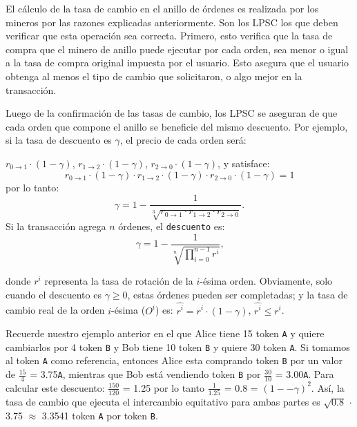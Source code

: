 \documentclass[UTF8,nofonts]{article}
\begin{document}
\begin{multicols}{2}
El c\'alculo de la tasa de cambio en el anillo de \'ordenes es realizada por los mineros por las razones explicadas anteriormente. Son los LPSC los que deben verificar que esta operaci\'on sea correcta. Primero, esto verifica que la tasa de compra que el minero de anillo puede ejecutar por cada orden, sea menor o igual a la tasa de compra original impuesta por el usuario. Esto asegura que el usuario obtenga  al menos el tipo de cambio que solicitaron, o algo mejor en la transacci\'on.	

Luego de la confirmaci\'on de las tasas de cambio, los LPSC se aseguran de que cada orden que compone el anillo se beneficie del mismo descuento. Por ejemplo, si la tasa de descuento es $\gamma$, el precio de cada orden ser\'a:

$r_{0\rightarrow 1} \cdot (1-\gamma)$, $r_{1\rightarrow 2} \cdot (1-\gamma)$, $r_{2 \rightarrow 0} \cdot (1-\gamma)$, y satisface: 
\begin{equation}
r_{0\rightarrow 1} \cdot (1-\gamma)\cdot r_{1\rightarrow 2} \cdot (1-\gamma) \cdot r_{2 \rightarrow 0} \cdot (1-\gamma) = 1
\end{equation}
por lo tanto: 
\begin{equation}
\gamma = 1- \frac{1}{\sqrt[3]{r_{0\rightarrow 1} \cdot r_{1\rightarrow 2} \cdot r_{2\rightarrow 0}}}\text{.}
\end{equation}
Si la transacci\'on agrega $n$ \'ordenes, el \texttt{descuento} es: 
\begin{equation}
\gamma = 1- \frac{1}{\sqrt[n]{\prod_{i=0}^{n-1} r^i}} \text{,}
\end{equation}

donde $r^i$ representa la tasa de rotaci\'on de la $i$-\'esima orden. Obviamente, solo cuando el descuento es $\gamma \ge 0$, estas \'ordenes pueden ser completadas; y la tasa de cambio real de la orden $i$-\'esima ($O^i$) es: $\hat{r^i} = r^i \cdot (1-\gamma)$, $\hat{r^i}\le r^i$.

Recuerde nuestro ejemplo anterior en el que Alice tiene 15 token \verb|A|  y quiere cambiarlos por 4 token \verb|B| y Bob tiene 10 token \verb|B| y quiere 30 token \verb|A|. Si tomamos al token \verb|A| como referencia, entonces Alice esta comprando token \verb|B| por un valor de $\frac{15}{4}$ = 3.75\verb|A|, mientras que Bob est\'a vendiendo token \verb|B| por $\frac{30}{10}$ = 3.00\verb|A|. Para calcular este descuento: $\frac{150}{120}$ = 1.25 por lo tanto $\frac{1}{1.25}$ = 0.8 = $(1 −- \gamma)^2$. As\'i, la tasa de cambio que ejecuta el intercambio equitativo para ambas partes es $\sqrt{0.8}$ $\cdot$ 3.75 $\approx$ 3.3541 token \verb|A| por token \verb|B|.


\end{multicols}
\end{document}
